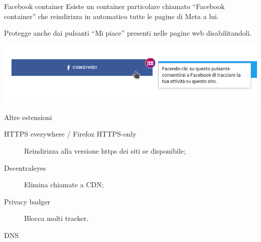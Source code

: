 \begin{myframe}{Facebook container}
  Esiste un container particolare chiamato ``Facebook container'' che reindirizza in automatico tutte le pagine di Meta a lui.

  Protegge anche dai pulsanti ``Mi piace'' presenti nelle pagine web disabilitandoli.

  \smallskip
  \includegraphics[width=.8\textwidth]{img/facebook_container}
\end{myframe}

\begin{myframe}{Altre estensioni}
  \begin{description}
    \item[HTTPS everywhere / Firefox HTTPS-only] Reindirizza alla versione https dei siti se disponibile;
    \item[Decentraleyes] Elimina chiamate a CDN;
    \item[Privacy badger] Blocca molti tracker.
  \end{description}
\end{myframe}

\begin{myframe}{DNS}
\end{myframe}

